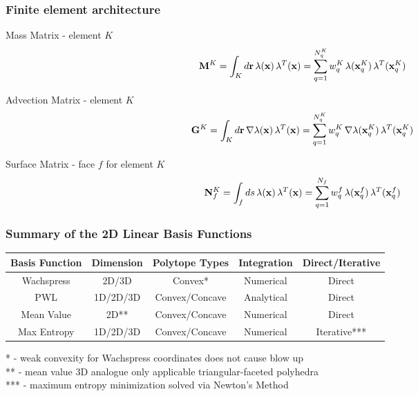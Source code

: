 \documentclass[compress,10pt]{beamer}
\renewcommand{\vec}[1]{\mathbf{#1}}
\begin{document}
\begin{frame}[t]\frametitle{Finite element architecture}
\begin{block}{Mass Matrix - element $K$}
\begin{equation*}
{\bf M}^K = \int_{K} d\vec{r} \, \lambda (\vec{x}) \, \lambda^T (\vec{x})  =  \sum\displaylimits_{q=1}^{N_q^K} w_q^K \, \lambda (\vec{x}_q^K) \, \lambda^T (\vec{x}_q^K) 
\end{equation*}
\end{block}
\begin{block}{Advection Matrix - element $K$}
\begin{equation*}
{\bf G}^K = \int_{K} d\vec{r} \, \vec{\nabla} \lambda (\vec{x}) \, \lambda^T (\vec{x}) = \sum\displaylimits_{q=1}^{N_q^K}  w_q^K \, \vec{\nabla} \lambda (\vec{x}_q^K) \, \lambda^T (\vec{x}_q^K) 
\end{equation*}
\end{block}
\begin{block}{Surface Matrix - face $f$ for element $K$}
\begin{equation*}
{\bf N}_f^K = \int_{f} ds \, \lambda (\vec{x}) \, \lambda^T (\vec{x})  = \sum\displaylimits_{q=1}^{N_f}  w_q^f \, \lambda (\vec{x}_q^f) \, \lambda^T (\vec{x}_q^f) 
\end{equation*}
\end{block}
\end{frame}
\begin{frame}[t]\frametitle{Summary of the 2D Linear Basis Functions}
\centering
\vspace{1cm}
\begin{table}
\footnotesize
\begin{tabular}{|c|c|c|c|c|}
\hline
Basis Function & Dimension & Polytope Types & Integration & Direct/Iterative \\
\hline \hline
Wachspress	&2D/3D&	Convex*&	Numerical	&Direct\\ \hline
PWL&	1D/2D/3D&	Convex/Concave&	Analytical	&Direct\\ \hline
Mean Value&	2D**&	Convex/Concave&	Numerical	&Direct\\ \hline
Max Entropy&	1D/2D/3D	&Convex/Concave&	Numerical&	Iterative***\\ \hline
\end{tabular}
\end{table}
\vspace{0.5cm}
\begin{block}{}
* - weak convexity for Wachspress coordinates does not cause blow up\\
** - mean value 3D analogue only applicable triangular-faceted polyhedra \\
*** - maximum entropy minimization solved via Newton's Method 
\end{block}
\end{frame}
\end{document}
